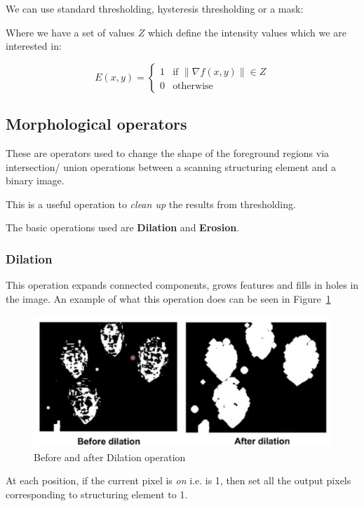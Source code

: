 \documentclass{article}
\begin{document}
We can use standard thresholding, hysteresis thresholding or a mask:

Where we have a set of values $Z$ which define the intensity values which we are interested in:

\[
  E(x,y) = \begin{cases}
    1 & \text{if } \| \nabla f(x,y) \|\in Z \\
    0 & \text{otherwise}
  \end{cases}
\]

\subsection{Morphological operators}

These are operators used to change the shape of the foreground regions via intersection/ union operations between a scanning structuring element and a binary image.

This is a useful operation to \textit{clean up} the results from thresholding.

The basic operations used are \textbf{Dilation} and \textbf{Erosion}.


\subsubsection{Dilation}

This operation expands connected components, grows features and fills in holes in the image. An example of what this operation does can be seen in Figure~\ref{fig:dilation-eg}

\begin{figure}[ht]
  \centering
  \includegraphics[scale=0.3]{figures/l3-3.png}
  \caption{\label{fig:dilation-eg} Before and after Dilation operation}
\end{figure}

At each position, if the current pixel is \textit{on}  i.e. is 1, then set all the output pixels corresponding to structuring element to 1.
\end{document}
